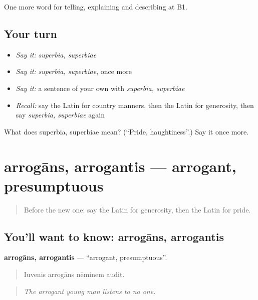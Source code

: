 \begin{grammarlens}[title={What you've built}]
One more word for telling, explaining and describing at B1.
\end{grammarlens}

\subsection*{Your turn}
\begin{itemize}
\raggedright
  \item \emph{Say it:} \emph{superbia, superbiae}
  \item \emph{Say it:} \emph{superbia, superbiae}, once more
  \item \emph{Say it:} a sentence of your own with \emph{superbia, superbiae}
  \item \emph{Recall:} say the Latin for country manners, then the Latin for generosity, then say \emph{superbia, superbiae} again
\end{itemize}

\begin{tcolorbox}[breakable,colback=teal!4,colframe=teal!35!black,title={Before you move on}]
What does superbia, superbiae mean? (\textquotedblleft{}Pride, haughtiness\textquotedblright{}.) Say it once more.
\end{tcolorbox}
\section[arrogāns, arrogantis]{arrogāns, arrogantis — arrogant, presumptuous}

\label{lesson:LA-C507-arrogans}



\begin{quote}
Before the new one: say the Latin for generosity, then the Latin for pride.
\end{quote}

\subsection*{You'll want to know: arrogāns, arrogantis}
\textbf{arrogāns, arrogantis} — \textquotedblleft{}arrogant, presumptuous\textquotedblright{}.

\begin{quote}
Iuvenis arrogāns nēminem audit.
\end{quote}

\begin{quote}
\emph{The arrogant young man listens to no one.}
\end{quote}

